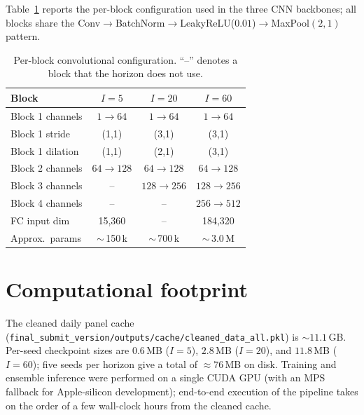 \documentclass{article}
\begin{document}
Table~\ref{tab:cnn-layers} reports the per-block configuration used in
the three CNN backbones; all blocks share the
Conv$\to$BatchNorm$\to$LeakyReLU($0.01$)$\to$MaxPool$(2,1)$ pattern.

\begin{table}[h]
  \centering
  \caption{Per-block convolutional configuration. ``--'' denotes a block
    that the horizon does not use.}
  \label{tab:cnn-layers}
  \small
  \begin{tabular}{lccc}
    \toprule
    Block & $I=5$ & $I=20$ & $I=60$ \\
    \midrule
    Block 1 channels    & $1\to64$ & $1\to64$ & $1\to64$ \\
    Block 1 stride      & (1,1) & (3,1) & (3,1) \\
    Block 1 dilation    & (1,1) & (2,1) & (3,1) \\
    Block 2 channels    & $64\to128$ & $64\to128$ & $64\to128$ \\
    Block 3 channels    & --         & $128\to256$ & $128\to256$ \\
    Block 4 channels    & --         & --          & $256\to512$ \\
    FC input dim        & 15{,}360 & --          & 184{,}320 \\
    Approx.\ params     & $\sim$\,150\,k & $\sim$\,700\,k & $\sim$\,3.0\,M \\
    \bottomrule
  \end{tabular}
\end{table}

\section{Computational footprint}
\label{app:compute}

The cleaned daily panel cache
(\texttt{final\_submit\_version/outputs/cache/cleaned\_data\_all.pkl}) is
$\sim 11.1$\,GB. Per-seed checkpoint sizes are $0.6$\,MB ($I=5$),
$2.8$\,MB ($I=20$), and $11.8$\,MB ($I=60$); five seeds per horizon give
a total of $\approx 76$\,MB on disk. Training and ensemble inference were
performed on a single CUDA GPU (with an MPS fallback for Apple-silicon
development); end-to-end execution of the pipeline takes on the order of
a few wall-clock hours from the cleaned cache.



\end{document}
